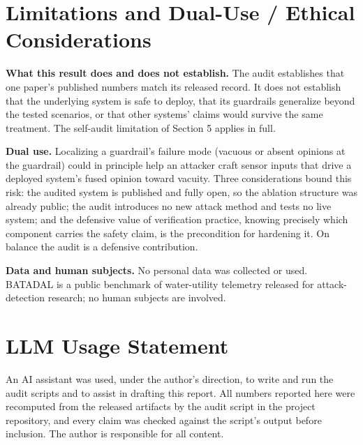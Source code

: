 \documentclass[11pt]{article}
\begin{document}
\appendix
\section{Limitations and Dual-Use / Ethical Considerations}
\textbf{What this result does and does not establish.} The audit establishes that one paper's published numbers match its released record. It does not establish that the underlying system is safe to deploy, that its guardrails generalize beyond the tested scenarios, or that other systems' claims would survive the same treatment. The self-audit limitation of Section 5 applies in full.

\textbf{Dual use.} Localizing a guardrail's failure mode (vacuous or absent opinions at the guardrail) could in principle help an attacker craft sensor inputs that drive a deployed system's fused opinion toward vacuity. Three considerations bound this risk: the audited system is published and fully open, so the ablation structure was already public; the audit introduces no new attack method and tests no live system; and the defensive value of verification practice, knowing precisely which component carries the safety claim, is the precondition for hardening it. On balance the audit is a defensive contribution.

\textbf{Data and human subjects.} No personal data was collected or used. BATADAL is a public benchmark of water-utility telemetry released for attack-detection research; no human subjects are involved.

\section{LLM Usage Statement}
An AI assistant was used, under the author's direction, to write and run the audit scripts and to assist in drafting this report. All numbers reported here were recomputed from the released artifacts by the audit script in the project repository, and every claim was checked against the script's output before inclusion. The author is responsible for all content.
\end{document}
